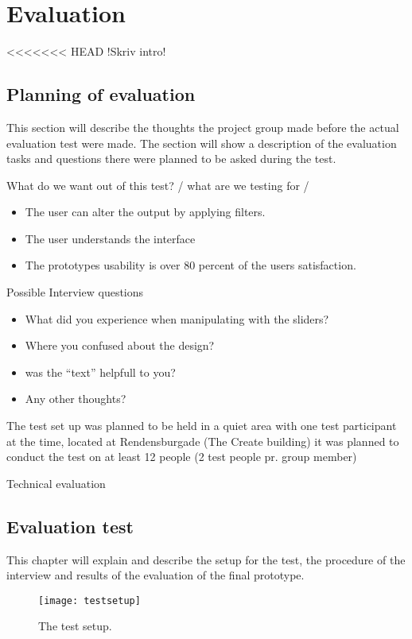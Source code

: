 \chapter{Evaluation}\label{ch:evaluation}
<<<<<<< HEAD
!Skriv intro!

\section{Planning of evaluation}
This section will describe the thoughts the project group made before the actual evaluation test were made. The section will show a description of the evaluation tasks and questions there were planned to be asked during the test. 

What do we want out of this test? / what are we testing for / 

\begin{itemize}
\item The user can alter the output by applying filters.
\item The user understands the interface  
\item The prototypes usability is over 80 percent of the users satisfaction.
\end{itemize}

Possible Interview questions
\begin{itemize}
\item What did you experience when manipulating with the sliders?
\item Where you confused about the design?
\item was the “text” helpfull to you?
\item Any other thoughts?
\end{itemize}

The test set up was planned to be held in a quiet area with one test participant at the time, located at Rendensburgade (The Create building) it was planned to conduct the test on at least 12 people (2 test people pr. group member) 

Technical evaluation 



\section{Evaluation test}
This chapter will explain and describe the setup for the test, the procedure of the interview and results of the evaluation of the final prototype. 

\begin{figure}[!h] 
\centering
\texttt{[image: testsetup]}
\caption{\label{fig:testsetup} The test setup.}
\end{figure}


